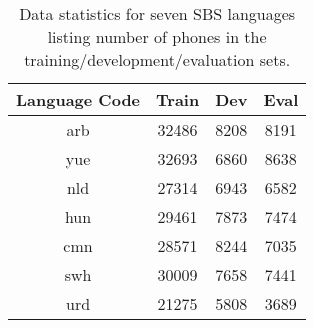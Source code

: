\begin{table}[t]
\centering
\begin{tabular}{| c || c | c | c |}
\hline
Language Code & Train & Dev & Eval \\
\hline
arb & 32486 & 8208 & 8191\\
yue & 32693 & 6860 & 8638 \\
nld & 27314 & 6943 & 6582 \\
hun & 29461 & 7873 & 7474\\
cmn & 28571 & 8244 & 7035\\
swh & 30009 & 7658 & 7441 \\
urd & 21275 & 5808 & 3689 \\
\hline
\end{tabular}
\caption{Data statistics for seven SBS languages listing number of phones in the training/development/evaluation sets.}
\label{tab:data}
\end{table}
